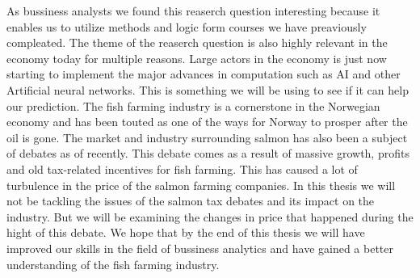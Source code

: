 As bussiness analysts we found this reaserch question interesting because it enables us to utilize  methods and logic form courses we have preaviously compleated.
The theme of the reaserch question is also highly relevant in the economy today for multiple reasons. Large actors in the economy is just now starting to implement the major advances in computation such as AI and other Artificial neural networks. This is something we will be using to see if it can help our prediction. The fish farming industry is a cornerstone in the Norwegian economy and has been touted as one of the ways for Norway to prosper after the oil is gone. The market and industry surrounding salmon has also been a subject of debates as of recently. This debate comes as a result of massive growth, profits and old tax-related incentives for fish farming. This has caused a lot of turbulence in the price of the salmon farming companies. In this thesis we will not be tackling the issues of the salmon tax debates and its impact on the industry. But we will be examining the changes in price that happened during the hight of this debate. We hope that by the end of this thesis we will have improved our skills in the field of bussiness analytics and have gained a better understanding of the fish farming industry.
